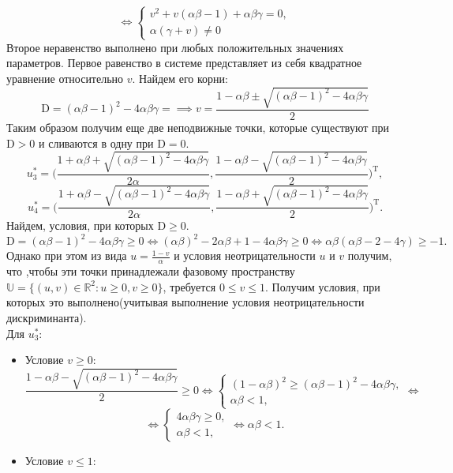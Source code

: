 \documentclass[10pt]{article}
\numberwithin{equation}{section}
\begin{document}
\begin{enumerate}
	\[\iff \begin{cases} v^2 + v(\alpha \beta - 1) + \alpha \beta \gamma = 0, \\ \alpha (\gamma + v) \ne 0 \end{cases} \]
	Второе неравенство выполнено при любых положительных значениях параметров. Первое равенство в системе представляет из себя квадратное уравнение относительно \( v \). Найдем его корни:
	\[ \mathrm{D} = (\alpha \beta - 1)^2 - 4 \alpha \beta \gamma = \implies v = \frac{1 - \alpha \beta \pm \sqrt{(\alpha \beta - 1)^2 - 4 \alpha \beta \gamma}}{2} \]
	Таким образом получим еще две неподвижные точки, которые существуют при \( \mathrm{D} > 0 \) и сливаются в одну при \( \mathrm{D} = 0 \).
	\[ u_3^* =  \Big( \frac{1 + \alpha \beta + \sqrt{(\alpha \beta - 1)^2 - 4 \alpha \beta \gamma}}{2\alpha},  \frac{1 - \alpha \beta - \sqrt{(\alpha \beta - 1)^2 - 4 \alpha \beta \gamma}}{2} \Big)^{\mathrm{T}}, \] 
	\[ u_4^* =  \Big( \frac{1 + \alpha \beta - \sqrt{(\alpha \beta - 1)^2 - 4 \alpha \beta \gamma}}{2\alpha},  \frac{1 - \alpha \beta + \sqrt{(\alpha \beta - 1)^2 - 4 \alpha \beta \gamma}}{2} \Big)^{\mathrm{T}}. \]
	Найдем, условия, при которых \( \mathrm{D} \geq 0 \).
	\[ \mathrm{D} = (\alpha \beta - 1)^2 - 4 \alpha \beta \gamma \ge 0 \iff (\alpha \beta)^2 - 2 \alpha \beta + 1 - 4 \alpha \beta \gamma \ge 0 \iff \alpha \beta ( \alpha \beta - 2 - 4 \gamma) \ge -1. \]
Однако при этом из вида \( u = \frac{1 - v}{\alpha} \) и условия неотрицательности \( u \) и \( v \) получим, что ,чтобы эти точки принадлежали фазовому пространству \( \mathbb{U} = \{(u,v) \in \mathbb{R}^2 : u \ge 0, v \ge 0 \} \), требуется \( 0 \le v \le 1 \). Получим условия, при которых это выполнено(учитывая выполнение условия неотрицательности дискриминанта).\\
Для \( u_3^* \):
\begin{itemize}
	\item Условие \( v \geq 0 \):
	\[ \frac{1 - \alpha \beta - \sqrt{(\alpha \beta - 1)^2 - 4\alpha \beta \gamma}}{2} \geq 0 \iff \begin{cases} (1 - \alpha \beta)^2 \geq (\alpha \beta - 1)^2 - 4 \alpha \beta \gamma, \\ \alpha \beta < 1, \end{cases} \iff \] 
	\[ \iff \begin{cases} 4 \alpha \beta \gamma \geq 0, \\ \alpha \beta < 1, \end{cases} \iff \alpha \beta < 1. \]	
	\item Условие \( v \leq 1 \):

\end{itemize}
\end{enumerate}
\end{document}
